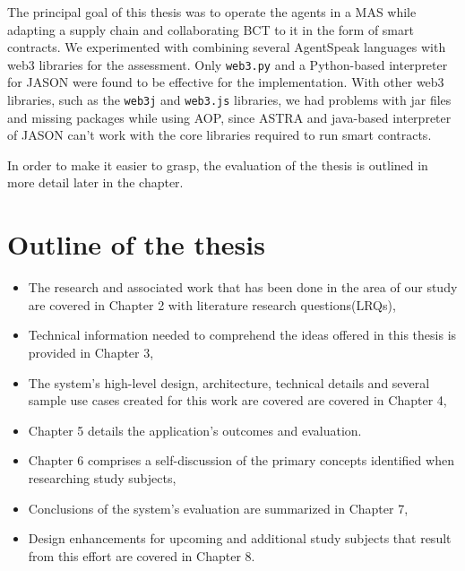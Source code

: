 The principal goal of this thesis was to operate the agents in a \ac{MAS} while adapting a supply chain and collaborating \ac{BCT} to it in the form of smart contracts. We experimented with combining several AgentSpeak languages with web3 libraries for the assessment. Only \texttt{web3.py} and a Python-based interpreter for JASON were found to be effective for the implementation. With other web3 libraries, such as the \texttt{web3j} and \texttt{web3.js} libraries, we had problems with jar files and missing packages while using \ac{AOP}, since ASTRA and java-based interpreter of JASON can't work with the core libraries required to run smart contracts.

 \vspace{.5cm}
 
In order to make it easier to grasp, the evaluation of the thesis is outlined in more detail later in the chapter.

\section{Outline of the thesis}
\begin{itemize}
    \item The research and associated work that has been done in the area of our study are covered in Chapter 2 with literature research questions(LRQs),
    
\vspace{.5cm}

    \item Technical information needed to comprehend the ideas offered in this thesis is provided in Chapter 3,
    
\vspace{.5cm}

    \item The system's high-level design, architecture, technical details and several sample use cases created for this work are covered  are covered in Chapter 4,
    
\vspace{.5cm}

    \item Chapter 5 details the application's outcomes and evaluation.
    
\vspace{.5cm}

    \item Chapter 6 comprises a self-discussion of the primary concepts identified when researching study subjects,

\vspace{.5cm}

    \item Conclusions of the system's evaluation are summarized in Chapter 7,

\vspace{.5cm}
  
    \item Design enhancements for upcoming and additional study subjects that result from this effort are covered in Chapter 8.
\end{itemize}


